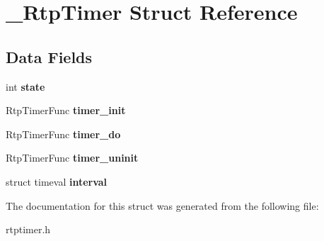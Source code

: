 \section{\+\_\+\+Rtp\+Timer Struct Reference}
\label{struct__RtpTimer}
\subsection*{Data Fields}
\begin{DoxyCompactItemize}
\item 
\mbox{\label{struct__RtpTimer_aff976c05a8de6f73ba642b2509355561}} 
int {\bfseries state}
\item 
\mbox{\label{struct__RtpTimer_a70d9f0b04bdda3e359a8b369e44e8b6b}} 
Rtp\+Timer\+Func {\bfseries timer\+\_\+init}
\item 
\mbox{\label{struct__RtpTimer_a686070de85a6cf701257e91bc0cfca49}} 
Rtp\+Timer\+Func {\bfseries timer\+\_\+do}
\item 
\mbox{\label{struct__RtpTimer_a67b22d61d7c7166035bfee618e0bb824}} 
Rtp\+Timer\+Func {\bfseries timer\+\_\+uninit}
\item 
\mbox{\label{struct__RtpTimer_a2312fd05ae7518a3987d8539dc941d1c}} 
struct timeval {\bfseries interval}
\end{DoxyCompactItemize}


The documentation for this struct was generated from the following file\+:\begin{DoxyCompactItemize}
\item 
rtptimer.\+h\end{DoxyCompactItemize}
